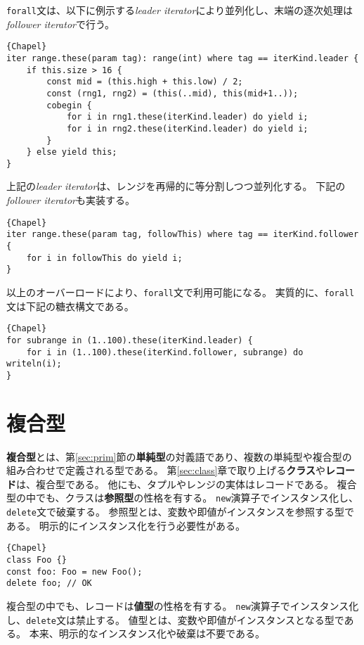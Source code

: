 \documentclass[10pt,a4paper]{book}
\begin{document}
\verb#forall#文は、以下に例示する\textit{leader iterator}により並列化し、末端の逐次処理は\textit{follower iterator}で行う。

\begin{Verbatim}{Chapel}
iter range.these(param tag): range(int) where tag == iterKind.leader {
	if this.size > 16 {
		const mid = (this.high + this.low) / 2;
		const (rng1, rng2) = (this(..mid), this(mid+1..));
		cobegin {
			for i in rng1.these(iterKind.leader) do yield i;
			for i in rng2.these(iterKind.leader) do yield i;
		}
	} else yield this;
}
\end{Verbatim}

上記の\textit{leader iterator}は、レンジを再帰的に等分割しつつ並列化する。
下記の\textit{follower iterator}も実装する。

\begin{Verbatim}{Chapel}
iter range.these(param tag, followThis) where tag == iterKind.follower {
	for i in followThis do yield i;
}
\end{Verbatim}

以上のオーバーロードにより、\verb#forall#文で利用可能になる。
実質的に、\verb#forall#文は下記の糖衣構文である。

\begin{Verbatim}{Chapel}
for subrange in (1..100).these(iterKind.leader) {
	for i in (1..100).these(iterKind.follower, subrange) do writeln(i);
}
\end{Verbatim}

\chapter{複合型\label{sec:class}}

\textbf{複合型}とは、第\ref{sec:prim}節の\textbf{単純型}の対義語であり、複数の単純型や複合型の組み合わせで定義される型である。
第\ref{sec:class}章で取り上げる\textbf{クラス}や\textbf{レコード}は、複合型である。
他にも、タプルやレンジの実体はレコードである。
複合型の中でも、クラスは\textbf{参照型}の性格を有する。
\verb#new#演算子でインスタンス化し、\verb#delete#文で破棄する。
参照型とは、変数や即値がインスタンスを参照する型である。
明示的にインスタンス化を行う必要性がある。

\begin{Verbatim}{Chapel}
class Foo {}
const foo: Foo = new Foo();
delete foo; // OK
\end{Verbatim}

複合型の中でも、レコードは\textbf{値型}の性格を有する。
\verb#new#演算子でインスタンス化し、\verb#delete#文は禁止する。
値型とは、変数や即値がインスタンスとなる型である。
本来、明示的なインスタンス化や破棄は不要である。
\end{document}
